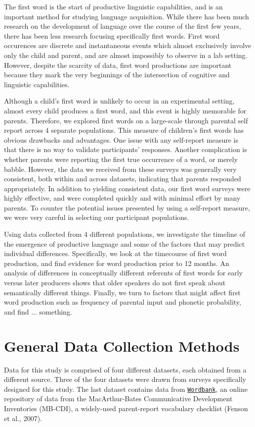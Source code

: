\documentclass[10pt,letterpaper]{article}
\begin{document}
The first word is the start of productive linguistic capabilities, and is an important method for studying language acquisition. While there has been much research on the development of language over the course of the first few years, there has been less research focusing specifically first words. First word occurences are discrete and instantaneous events which almost exclusively involve only the child and parent, and are almost impossibly to observe in a lab setting. However, despite the scarcity of data, first word productions are important because they mark the very beginnings of the intersection of cognitive and linguistic capabilities. 


Although a child's first word is unlikely to occur in an experimental setting, almost every child produces a first word, and this event is highly memorable for parents. Therefore, we explored first words on a large-scale through parental self report across 4 separate populations. This measure of children's first words has obvious drawbacks and advantages. One issue with any self-report measure is that there is no way to validate participants' responses. Another complication is whether parents were reporting the first true occurrence of a word, or merely babble. However, the data we received from these surveys was generally very consistent, both within and across datasets, indicating that parents responded appropriately. In addition to yielding consistent data, our first word surveys were highly effective, and were completed quickly and with minimal effort by many parents. To counter the potential issues presented by using a self-report measure, we were very careful in selecting our participant populations. 

Using data collected from 4 different populations, we investigate the timeline of the emergence of productive language and some of the factors that may predict individual differences. Specifically, we look at the timecourse of first word production, and find evidence for word production prior to 12 months. An analysis of differences in conceptually different referents of first words for early versus later producers shows that older speakers do not first speak about semantically different things. Finally, we turn to factors that might affect first word production such as frequency of parental input and phonetic probability, and find ... something.  

\section{General Data Collection Methods}
Data for this study is comprised of four different datasets, each obtained from a different source. Three of the four datasets were drawn from surveys specifically designed for this study. The last dataset contains data from \href{http://wordbank.stanford.edu}{\tt{Wordbank}}, an online repository of data from the MacArthur-Bates Communicative Development Inventories (MB-CDI), a widely-used parent-report vocabulary checklist (Fenson et al., 2007).
\end{document}

